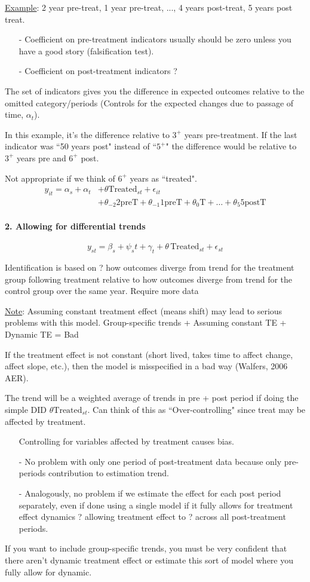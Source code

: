 \documentclass[a4paper,11pt]{article}
\newcommand{\myparagraph}[1]{\paragraph{#1}\mbox{}\par}
\begin{document}
\underline{Example}: 2 year pre-treat, 1 year pre-treat, ..., 4 years post-treat, 5 years post treat.
\begin{itemize}
	\item[-] Coefficient on pre-treatment indicators usually should be zero unless you have a good story (falsification test).
	\item[-] Coefficient on post-treatment indicators ?
\end{itemize}

The set of indicators gives you the difference in expected outcomes relative to the omitted category/periods (Controls for the expected changes due to passage of time, $\alpha_t$).

In this example, it's the difference relative to $3^+$ years pre-treatment. If the last indicator was ``50 years post" instead of ``$5^+$" the difference would be relative to $3^+$ years pre and $6^+$ post.

Not appropriate if we think of $6^+$ years as ``treated".
\begin{align}
	y_{it} = \alpha_s + \alpha_t & + \theta\text{Treated}_{st} + \epsilon_{it} \nonumber\\
	& + \theta_{-2}\text{2preT} + \theta_{-1}\text{1preT} + \theta_0\text{T}+\ldots+\theta_5\text{5postT}
\end{align}
\myparagraph{2. Allowing for differential trends}
\begin{equation}
	y_{st}=\beta_s + \psi_s t + \gamma _t + \theta\,\text{Treated}_{st} + \epsilon_{st}
\end{equation}

	Identification is based on ? how outcomes diverge from trend for the treatment group following treatment relative to how outcomes diverge from trend for the control group over the same year. {Require more data}
	
	\underline{Note}: Assuming constant treatment effect (means shift) may lead to serious problems with this model. Group-specific trends + Assuming constant TE + Dynamic TE = Bad

If the treatment effect is not constant (short lived, takes time to affect change, affect slope, etc.), then the model is misspecified in a bad way (Walfers, 2006 AER).

The trend will be a weighted average of trends in pre + post period if doing the simple DID $\theta\text{Treated}_{st}$. Can think of this as ``Over-controlling" since treat may be affected by treatment.

\begin{itemize}
	\item[\danger] Controlling for variables affected by treatment causes bias. 
	\item[-] No problem with only one period of post-treatment data because only pre-periods contribution to estimation trend.
	\item[-] Analogously, no problem if we estimate the effect for each post period separately, even if done using a single model if it fully allows for treatment effect dynamics ? allowing treatment effect to ? across all post-treatment periods.
\end{itemize}

If you want to include group-specific trends, you must be very confident that there aren't dynamic treatment effect or estimate this sort of model where you fully allow for dynamic.
	
\end{document}
